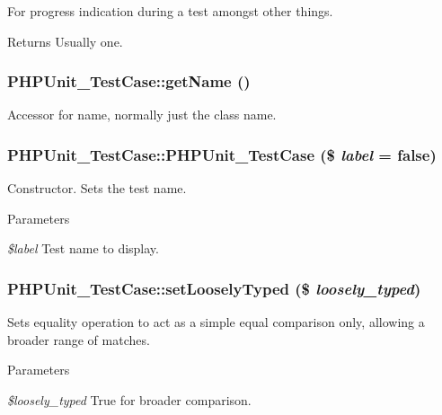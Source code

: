 For progress indication during a test amongst other things. \begin{DoxyReturn}{Returns}
Usually one. 
\end{DoxyReturn}
\hypertarget{class_p_h_p_unit___test_case_a5993676a471e992b22614d43d46d2829}{
\subsubsection[{getName}]{\setlength{\rightskip}{0pt plus 5cm}PHPUnit\_\-TestCase::getName ()}}
\label{class_p_h_p_unit___test_case_a5993676a471e992b22614d43d46d2829}
Accessor for name, normally just the class name. \hypertarget{class_p_h_p_unit___test_case_aa9026b99fa5faf9174a845db4c65f7d7}{
\subsubsection[{PHPUnit\_\-TestCase}]{\setlength{\rightskip}{0pt plus 5cm}PHPUnit\_\-TestCase::PHPUnit\_\-TestCase (\$ {\em label} = {\ttfamily false})}}
\label{class_p_h_p_unit___test_case_aa9026b99fa5faf9174a845db4c65f7d7}
Constructor. Sets the test name. 
\begin{DoxyParams}{Parameters}
\item[{\em \$label}]Test name to display. \end{DoxyParams}
\hypertarget{class_p_h_p_unit___test_case_aa23d060b8bc5da84ca3e76ba7d41f64b}{
\subsubsection[{setLooselyTyped}]{\setlength{\rightskip}{0pt plus 5cm}PHPUnit\_\-TestCase::setLooselyTyped (\$ {\em loosely\_\-typed})}}
\label{class_p_h_p_unit___test_case_aa23d060b8bc5da84ca3e76ba7d41f64b}
Sets equality operation to act as a simple equal comparison only, allowing a broader range of matches. 
\begin{DoxyParams}{Parameters}
\item[{\em \$loosely\_\-typed}]True for broader comparison. \end{DoxyParams}
